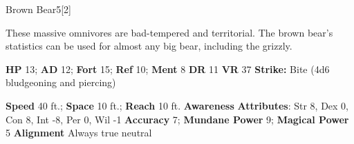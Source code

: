   
  \begin{monsection}{Brown Bear}{5}[2]
    \vspace{-1em}\vspace{-1em}
    \vspace{0em}

    
      These massive omnivores are bad-tempered and territorial.
      The brown bear's statistics can be used for almost any big bear, including the grizzly.
    
    

    \begin{spellcontent}
      \begin{spelltargetinginfo}
        \pari \textbf{HP} 13;
          \textbf{AD} 12;
          \textbf{Fort} 15;
          \textbf{Ref} 10;
          \textbf{Ment} 8
        \pari \textbf{DR} 11
        \pari \textbf{VR} 37
        \pari \textbf{Strike:}
            Bite  (4d6 bludgeoning and piercing)
      \end{spelltargetinginfo}
    \end{spellcontent}
    \begin{monsterfooter}
      \pari \textbf{Speed} 40 ft.;
        \textbf{Space} 10 ft.;
        \textbf{Reach} 10 ft.
      \pari \textbf{Awareness} 
      \pari \textbf{Attributes}:
        Str 8, Dex 0,
        Con 8, Int -8,
        Per 0, Wil -1
      \pari \textbf{Accuracy} 7;
        \textbf{Mundane Power} 9;
      \textbf{Magical Power} 5
      \pari \textbf{Alignment} Always true neutral
    \end{monsterfooter}
  \end{monsection}
  
